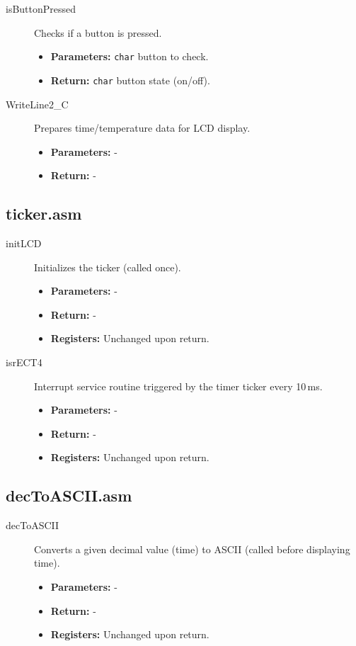 \documentclass[a4paper,12pt]{article}
\begin{document}
\begin{description}
    \item[isButtonPressed] Checks if a button is pressed.
    \begin{itemize}
        \item \textbf{Parameters:} \texttt{char} button to check.
        \item \textbf{Return:} \texttt{char} button state (on/off).
    \end{itemize}
    
    \item[WriteLine2\_C] Prepares time/temperature data for LCD display.
    \begin{itemize}
        \item \textbf{Parameters:} -
        \item \textbf{Return:} -
    \end{itemize}
\end{description}

\subsection{ticker.asm}

\begin{description}
    \item[initLCD] Initializes the ticker (called once).
    \begin{itemize}
        \item \textbf{Parameters:} -
        \item \textbf{Return:} -
        \item \textbf{Registers:} Unchanged upon return.
    \end{itemize}
    
    \item[isrECT4] Interrupt service routine triggered by the timer ticker every 10\,ms.
    \begin{itemize}
        \item \textbf{Parameters:} -
        \item \textbf{Return:} -
        \item \textbf{Registers:} Unchanged upon return.
    \end{itemize}
\end{description}

\subsection{decToASCII.asm}

\begin{description}
    \item[decToASCII] Converts a given decimal value (time) to ASCII (called before displaying time).
    \begin{itemize}
        \item \textbf{Parameters:} -
        \item \textbf{Return:} -
        \item \textbf{Registers:} Unchanged upon return.
    \end{itemize}
\end{description}
\end{document}
